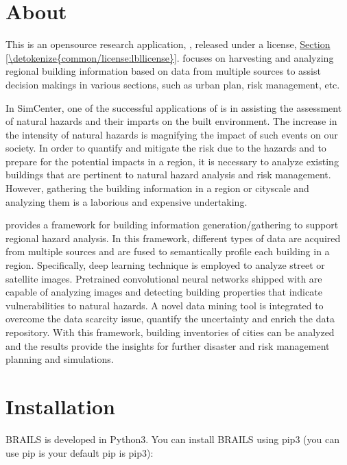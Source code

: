 \documentclass[letterpaper,10pt,english]{sphinxmanual}
\begin{document}
\section{About}
\label{\detokenize{common/user_manual/about:about}}\label{\detokenize{common/user_manual/about:lblabout}}\label{\detokenize{common/user_manual/about::doc}}
\sphinxAtStartPar
This is an open\sphinxhyphen{}source research application, ,
released under a  license, \hyperref[\detokenize{common/license:lbllicense}]{Section \ref{\detokenize{common/license:lbllicense}}}.
 focuses on harvesting and analyzing regional building information based on data from multiple sources to
assist decision makings in various sections, such as urban plan, risk management, etc.

\sphinxAtStartPar
In SimCenter, one of the successful applications of  is in assisting
the assessment of natural hazards and their imparts on the built environment.
The increase in the intensity of natural hazards is magnifying the impact of such events on our society.
In order to quantify and mitigate the risk due to the hazards and to prepare for the potential impacts in a region,
it is necessary to analyze existing buildings that are pertinent to natural hazard analysis and risk management.
However, gathering the building information in a region\sphinxhyphen{} or city\sphinxhyphen{}scale and analyzing them is a laborious and expensive undertaking.

\sphinxAtStartPar
{} provides a framework for building information generation/gathering to support regional hazard analysis.
In this framework, different types of data are acquired from multiple sources
and are fused to semantically profile each building in a region.
Specifically, deep learning technique is employed to analyze street or satellite images.
Pretrained convolutional neural networks shipped with  are capable of analyzing images and detecting building properties that indicate vulnerabilities to natural hazards.
A novel data mining tool is integrated to overcome the data scarcity issue, quantify the uncertainty and enrich the data repository.
With this framework, building inventories of cities can be analyzed and the results provide the insights for further disaster and risk management planning and simulations.


\section{Installation}
\label{\detokenize{common/user_manual/installation:installation}}\label{\detokenize{common/user_manual/installation:lbl-install}}\label{\detokenize{common/user_manual/installation::doc}}
\sphinxAtStartPar
BRAILS is developed in Python3.
You can install BRAILS using pip3 (you can use pip is your default pip is pip3):
\end{document}
